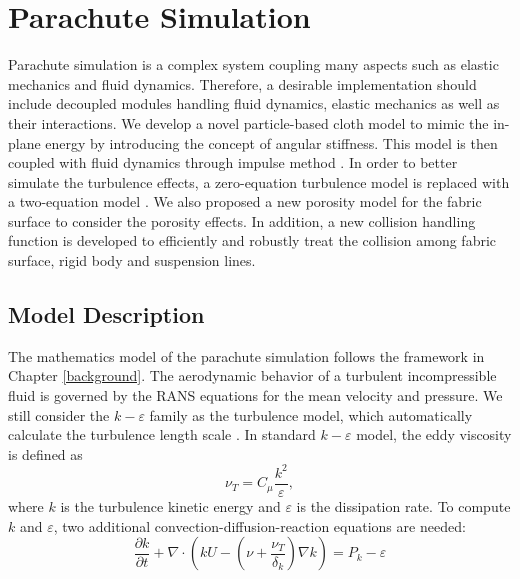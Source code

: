\chapter{Parachute Simulation}
Parachute simulation is a complex system coupling many aspects such as 
elastic mechanics and fluid dynamics. Therefore, a desirable implementation should include decoupled modules handling fluid dynamics, elastic mechanics as well as their interactions. We develop a novel particle-based cloth model to mimic the in-plane energy by introducing the concept of angular stiffness. This model is then coupled with fluid dynamics through impulse method \cite{cortez1997dynamics}. In order to better simulate the turbulence effects, a zero-equation turbulence model \cite{baldwin1978thin} is replaced with a two-equation model \cite{Yakhot1986Renormalization}. We also proposed a new 
porosity model for the fabric surface to consider the porosity effects. 
In addition, a new collision handling function is developed to efficiently and 
robustly treat the collision among fabric surface, rigid body and suspension lines.

\section{Model Description}
The mathematics model of the parachute simulation follows the framework in Chapter \ref{background}. The aerodynamic behavior of a turbulent incompressible fluid is governed by the RANS equations for the mean velocity and pressure. We still consider the $k-\varepsilon$ family as the turbulence model, which automatically calculate the turbulence length scale \cite{WilcoxTurbulence2006}.  In standard
$k-\varepsilon$ model, the eddy viscosity \cite{PopeTurbulent2000} is defined as 
\begin{equation} \nu_T =
C_{\mu}\frac{k^2}{\varepsilon}, \label{eq:nuT} 
\end{equation} 
where $k$ is the turbulence kinetic energy and $\varepsilon$ is the dissipation rate. To compute $k$ and $\varepsilon$, two additional convection-diffusion-reaction equations
are needed: 
\begin{equation} 
\frac{\partial k}{\partial
t}+\nabla\cdot(kU-(\nu+\frac{\nu_T}{\delta_k})\nabla k) =P_k - \varepsilon
\label{eq:k} 
\end{equation} 

